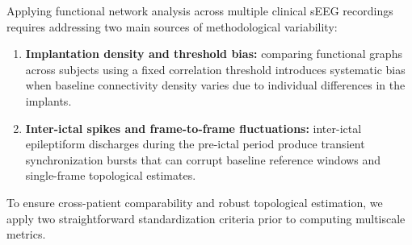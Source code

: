 Applying functional network analysis across multiple clinical sEEG recordings requires addressing two main sources of methodological variability:
\begin{enumerate}
    \item[(i)] \textbf{Implantation density and threshold bias:} comparing functional graphs across subjects using a fixed correlation threshold introduces systematic bias when baseline connectivity density varies due to individual differences in the implants.
    \item[(ii)] \textbf{Inter-ictal spikes and frame-to-frame fluctuations:} inter-ictal epileptiform discharges during the pre-ictal period produce transient synchronization bursts that can corrupt baseline reference windows and single-frame topological estimates.
\end{enumerate}
To ensure cross-patient comparability and robust topological estimation, we apply two straightforward standardization criteria prior to computing multiscale metrics.

